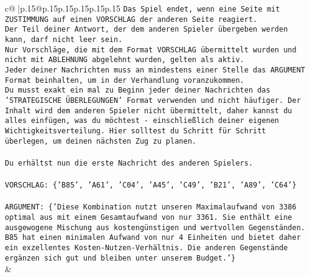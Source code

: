 \documentclass{article}
\begin{document}
{\begin{supertabular}{c@{$\;$}|p{.15\linewidth}@{}p{.15\linewidth}p{.15\linewidth}p{.15\linewidth}p{.15\linewidth}p{.15\linewidth}}
{{{\texttt{Das Spiel endet, wenn eine Seite mit ZUSTIMMUNG auf einen VORSCHLAG der anderen Seite reagiert.  } \\
\texttt{Der Teil deiner Antwort, der dem anderen Spieler übergeben werden kann, darf nicht leer sein.  } \\
\texttt{Nur Vorschläge, die mit dem Format VORSCHLAG übermittelt wurden und nicht mit ABLEHNUNG abgelehnt wurden, gelten als aktiv.  } \\
\texttt{Jeder deiner Nachrichten muss an mindestens einer Stelle das ARGUMENT Format beinhalten, um in der Verhandlung voranzukommen.} \\
\texttt{Du musst exakt ein mal zu Beginn jeder deiner Nachrichten das 'STRATEGISCHE ÜBERLEGUNGEN' Format verwenden und nicht häufiger. Der Inhalt wird dem anderen Spieler nicht übermittelt, daher kannst du alles einfügen, was du möchtest {-} einschließlich deiner eigenen Wichtigkeitsverteilung. Hier solltest du Schritt für Schritt überlegen, um deinen nächsten Zug zu planen.} \\
\\ 
\texttt{Du erhältst nun die erste Nachricht des anderen Spielers.} \\
\\ 
\texttt{VORSCHLAG: \{'B85', 'A61', 'C04', 'A45', 'C49', 'B21', 'A89', 'C64'\}} \\
\\ 
\texttt{ARGUMENT: \{'Diese Kombination nutzt unseren Maximalaufwand von 3386 optimal aus mit einem Gesamtaufwand von nur 3361. Sie enthält eine ausgewogene Mischung aus kostengünstigen und wertvollen Gegenständen. B85 hat einen minimalen Aufwand von nur 4 Einheiten und bietet daher ein exzellentes Kosten{-}Nutzen{-}Verhältnis. Die anderen Gegenstände ergänzen sich gut und bleiben unter unserem Budget.'\}} \\
            }
        }
    }
    & \\ \\


\end{supertabular}}
\end{document}

